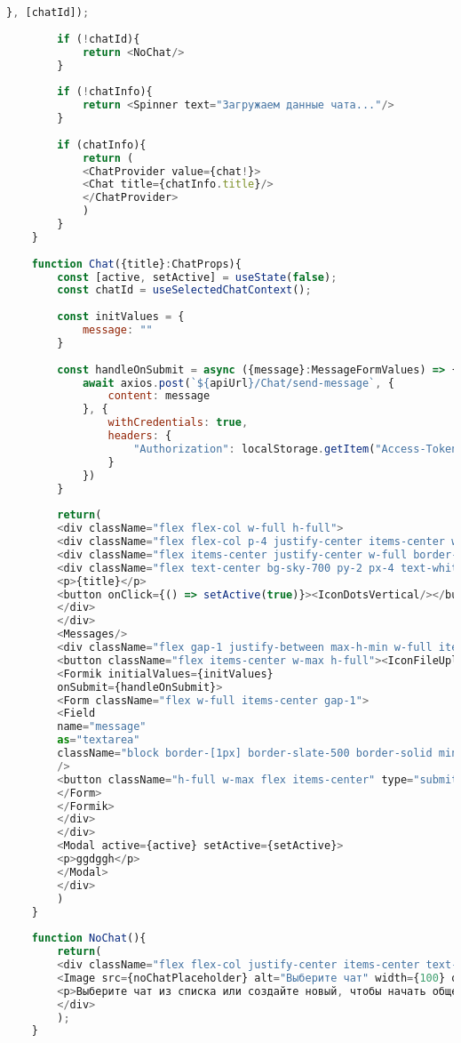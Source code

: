 \begin{lstlisting}[language=javascript]
		}, [chatId]);
		
		if (!chatId){
			return <NoChat/>
		}
		
		if (!chatInfo){
			return <Spinner text="Загружаем данные чата..."/>
		}
		
		if (chatInfo){
			return (
			<ChatProvider value={chat!}>
			<Chat title={chatInfo.title}/>
			</ChatProvider>
			)
		}
	}
	
	function Chat({title}:ChatProps){
		const [active, setActive] = useState(false);
		const chatId = useSelectedChatContext();
		
		const initValues = {
			message: ""
		}
		
		const handleOnSubmit = async ({message}:MessageFormValues) => {
			await axios.post(`${apiUrl}/Chat/send-message`, {
				content: message
			}, {
				withCredentials: true,
				headers: {
					"Authorization": localStorage.getItem("Access-Token")
				}
			})
		}
		
		return(
		<div className="flex flex-col w-full h-full">
		<div className="flex flex-col p-4 justify-center items-center w-full h-full">
		<div className="flex items-center justify-center w-full border-slate-300 border-b border-solid pb-2">
		<div className="flex text-center bg-sky-700 py-2 px-4 text-white rounded-lg">
		<p>{title}</p>
		<button onClick={() => setActive(true)}><IconDotsVertical/></button>
		</div>
		</div>
		<Messages/>
		<div className="flex gap-1 justify-between max-h-min w-full items-center"> {/* Добавлено items-center */}
		<button className="flex items-center w-max h-full"><IconFileUpload className="h-10 w-10" /></button> {/* Добавлено items-center и h-full */}
		<Formik initialValues={initValues} 
		onSubmit={handleOnSubmit}>
		<Form className="flex w-full items-center gap-1">
		<Field 
		name="message"
		as="textarea"
		className="block border-[1px] border-slate-500 border-solid min-w-[70%] rounded-xl flex-grow"
		/> 
		<button className="h-full w-max flex items-center" type="submit"><IconSend2 className="h-10 w-10" /></button> 
		</Form>
		</Formik>
		</div>
		</div>
		<Modal active={active} setActive={setActive}>
		<p>ggdggh</p>
		</Modal>
		</div>
		)
	}
	
	function NoChat(){
		return(
		<div className="flex flex-col justify-center items-center text-center h-full w-full">
		<Image src={noChatPlaceholder} alt="Выберите чат" width={100} objectFit="cover"/>
		<p>Выберите чат из списка или создайте новый, чтобы начать общение</p>
		</div>  
		);
	}	
\end{lstlisting}

